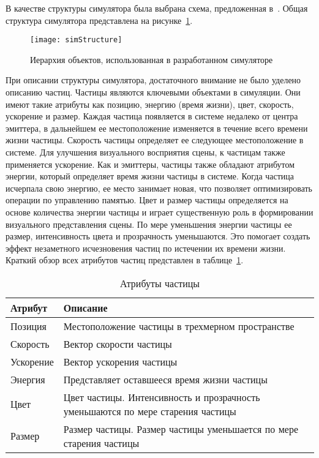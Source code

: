 В качестве структуры симулятора была выбрана схема, предложенная
в~\cite{Somasekaran2005UsingPS}. Общая структура симулятора представлена на
рисунке~\ref{fig:simStructure}.
\begin{figure}[htb]
	\centering
	\texttt{[image: simStructure]}
    \caption{Иерархия объектов, использованная в разработанном симуляторе}%
    \label{fig:simStructure}
\end{figure}

При описании структуры симулятора, достаточного внимание не было уделено
описанию частиц. Частицы являются ключевыми объектами в симуляции. Они имеют
такие атрибуты как позицию, энергию (время жизни), цвет, скорость, ускорение и
размер.  Каждая частица появляется в системе недалеко от центра эмиттера, в
дальнейшем ее местоположение изменяется в течение всего времени жизни частицы.
Скорость частицы определяет ее следующее местоположение в системе. Для
улучшения визуального восприятия сцены, к частицам также применяется ускорение.
Как и эмиттеры, частицы также обладают атрибутом энергии, который определяет
время жизни частицы в системе. Когда частица исчерпала свою энергию, ее место
занимает новая, что позволяет оптимизировать операции по управлению памятью.
Цвет и размер частицы определяется на основе количества энергии частицы и играет
существенную роль в формировании визуального представления сцены. По мере
уменьшения энергии частицы ее размер, интенсивность цвета и прозрачность
уменьшаются. Это помогает создать эффект незаметного исчезновения частиц по
истечении их времени жизни. Краткий обзор всех атрибутов частиц представлен в
таблице~\ref{table:partAttribs}.
\begin{table}[htb]
\caption{Атрибуты частицы}%
\label{table:partAttribs}
\centering
\small
\begin{tabular}{| p{} | p{} |}
    \hline
    Атрибут & Описание \\
    \hline
    Позиция & Местоположение частицы в трехмерном пространстве \\
    Скорость & Вектор скорости частицы \\
    Ускорение & Вектор ускорения частицы \\
    Энергия & Представляет оставшееся время жизни частицы \\
    Цвет & Цвет частицы. Интенсивность и прозрачность уменьшаются по мере
    старения частицы \\
    Размер & Размер частицы. Размер частицы уменьшается по мере старения частицы \\
    \hline
\end{tabular}
\end{table}

